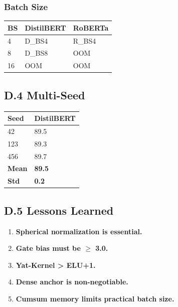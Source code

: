 \subsubsection{Batch Size}

\begin{table}[H]
\centering
\small
\begin{tabular}{lll}
\toprule
\textbf{BS} & \textbf{DistilBERT} & \textbf{RoBERTa} \\
\midrule
4 & {{D\_BS4}} & {{R\_BS4}} \\
8 & {{D\_BS8}} & OOM \\
16 & OOM & OOM \\
\bottomrule
\end{tabular}
\end{table}

\subsection{D.4 Multi-Seed}

\begin{table}[H]
\centering
\small
\begin{tabular}{ll}
\toprule
\textbf{Seed} & \textbf{DistilBERT} \\
\midrule
42 & 89.5 \\
123 & 89.3 \\
456 & 89.7 \\
\textbf{Mean} & \textbf{89.5} \\
\textbf{Std} & \textbf{0.2} \\
\bottomrule
\end{tabular}
\end{table}

\subsection{D.5 Lessons Learned}

\begin{enumerate}
\item \textbf{Spherical normalization is essential.}
\item \textbf{Gate bias must be $\ge$ 3.0.}
\item \textbf{Yat-Kernel > ELU+1.}
\item \textbf{Dense anchor is non-negotiable.}
\item \textbf{Cumsum memory limits practical batch size.}

\end{enumerate}
